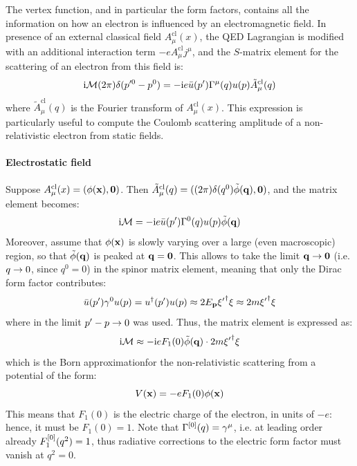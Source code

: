 The vertex function, and in particular the form factors, contains all the information on how an electron is influenced by an electromagnetic field. In presence of an external classical field $ A^\text{cl}_\mu(x) $, the QED Lagrangian is modified with an additional interaction term $ - e A^\text{cl}_\mu j^\mu $, and the $ S $-matrix element for the scattering of an electron from this field is:
\begin{equation*}
  \mathrm{i} \mathcal{M} (2\pi) \delta(p'^0 - p^0) = - \mathrm{i} e \bar{u}(p') \Gamma^\mu(q) u(p) \tilde{A}^\text{cl}_\mu(q)
\end{equation*}
where $ \tilde{A}^\text{cl}_\mu(q) $ is the Fourier transform of $ A^\text{cl}_\mu(x) $. This expression is particularly useful to compute the Coulomb scattering amplitude of a non-relativistic electron from static fields.

\paragraph{Electrostatic field}

Suppose $ A^\text{cl}_\mu(x) = (\phi(\mathbf{x}) , \mathbf{0}) $. Then $ \tilde{A}^\text{cl}_\mu(q) = ((2\pi) \delta(q^0) \tilde{\phi}(\mathbf{q}) , \mathbf{0}) $, and the matrix element becomes:
\begin{equation*}
  \mathrm{i} \mathcal{M} = - \mathrm{i} e \bar{u}(p') \Gamma^0(q) u(p) \tilde{\phi}(\mathbf{q})
\end{equation*}
Moreover, assume that $ \phi(\mathbf{x}) $ is slowly varying over a large (even macroscopic) region, so that $ \tilde{\phi}(\mathbf{q}) $ is peaked at $ \mathbf{q} = \mathbf{0} $. This allows to take the limit $ \mathbf{q} \rightarrow \mathbf{0} $ (i.e. $ q \rightarrow 0 $, since $ q^0 = 0 $) in the spinor matrix element, meaning that only the Dirac form factor contributes:
\begin{equation*}
  \bar{u}(p') \gamma^0 u(p) = u^\dagger(p') u(p) \approx 2E_{\mathbf{p}} {\xi'}^\dagger \xi \approx 2m {\xi'}^\dagger \xi
\end{equation*}
where  in the limit $ p' - p \rightarrow 0 $ was used. Thus, the matrix element is expressed as:
\begin{equation*}
  \mathrm{i} \mathcal{M} \approx - \mathrm{i} e F_1(0) \tilde{\phi}(\mathbf{q}) \cdot 2m {\xi'}^\dagger \xi
\end{equation*}
which is the Born approximation\footnotemark for the non-relativistic scattering from a potential of the form:
\begin{equation}
  V(\mathbf{x}) = - e F_1(0) \phi(\mathbf{x})
\end{equation}
This means that $ F_1(0) $ is the electric charge of the electron, in units of $ -e $: hence, it must be $ F_1(0) = 1 $. Note that $ \Gamma^{[0]}(q) = \gamma^\mu $, i.e. at leading order already $ F_1^{[0]}(q^2) = 1 $, thus radiative corrections to the electric form factor must vanish at $ q^2 = 0 $.

